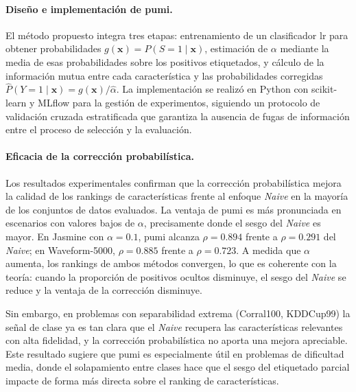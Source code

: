 \paragraph{Diseño e implementación de \acrshort{pumi}.}
El método propuesto integra tres etapas: entrenamiento de un clasificador \acrshort{lr} para obtener probabilidades $g(\mathbf{x}) = P(S=1 \mid \mathbf{x})$, estimación de $\alpha$ mediante la media de esas probabilidades sobre los positivos etiquetados, y cálculo de la información mutua entre cada característica y las probabilidades corregidas $\hat{P}(Y=1 \mid \mathbf{x}) = g(\mathbf{x}) / \hat{\alpha}$. La implementación se realizó en Python con scikit-learn y MLflow para la gestión de experimentos, siguiendo un protocolo de validación cruzada estratificada que garantiza la ausencia de fugas de información entre el proceso de selección y la evaluación.

\paragraph{Eficacia de la corrección probabilística.}
Los resultados experimentales confirman que la corrección probabilística mejora la calidad de los rankings de características frente al enfoque \textit{Naive} en la mayoría de los conjuntos de datos evaluados. La ventaja de \acrshort{pumi} es más pronunciada en escenarios con valores bajos de $\alpha$, precisamente donde el sesgo del \textit{Naive} es mayor. En Jasmine con $\alpha=0.1$, \acrshort{pumi} alcanza $\rho=0.894$ frente a $\rho=0.291$ del \textit{Naive}; en Waveform-5000, $\rho=0.885$ frente a $\rho=0.723$. A medida que $\alpha$ aumenta, los rankings de ambos métodos convergen, lo que es coherente con la teoría: cuando la proporción de positivos ocultos disminuye, el sesgo del \textit{Naive} se reduce y la ventaja de la corrección disminuye.

Sin embargo, en problemas con separabilidad extrema (Corral100, KDDCup99) la señal de clase ya es tan clara que el \textit{Naive} recupera las características relevantes con alta fidelidad, y la corrección probabilística no aporta una mejora apreciable. Este resultado sugiere que \acrshort{pumi} es especialmente útil en problemas de dificultad media, donde el solapamiento entre clases hace que el sesgo del etiquetado parcial impacte de forma más directa sobre el ranking de características.

